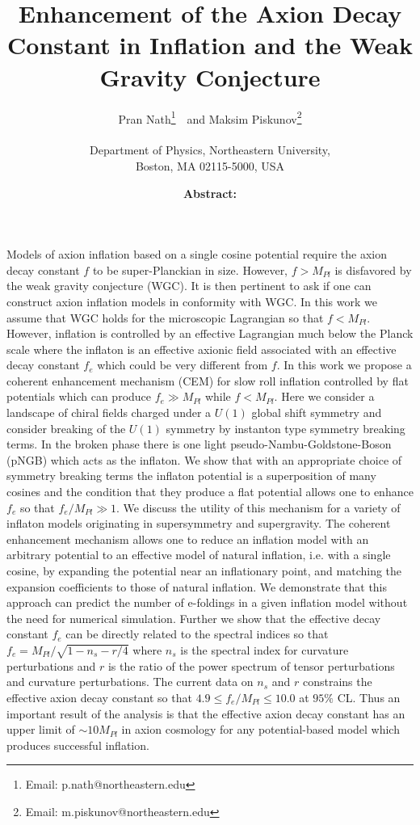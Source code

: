 \documentclass[12pt]{article}
\author{
  Pran Nath\footnote{Email: p.nath@northeastern.edu}~\ and
  Maksim Piskunov\footnote{Email: m.piskunov@northeastern.edu}\\~\\
  Department of Physics, Northeastern University,\\
  Boston, MA 02115-5000, USA
}
\title{
  Enhancement of the Axion Decay Constant in Inflation and the Weak Gravity Conjecture
}
\begin{document}
\maketitle
\date

\textbf{Abstract:}
Models of axion inflation based on a single cosine potential require the axion decay constant $f$ to be super-Planckian in size.
However, $f > M_{Pl}$ is disfavored by the weak gravity conjecture (WGC).
It is then pertinent to ask if one can construct axion inflation models in conformity with WGC.
In this work we assume that WGC holds for the microscopic Lagrangian so that $f < M_{Pl}$.
However, inflation is controlled by an effective Lagrangian much below the Planck scale where the inflaton is an effective axionic field associated with an effective decay constant $f_e$ which could be very different from $f$.
In this work we propose a coherent enhancement mechanism (CEM) for slow roll inflation controlled by flat potentials which can produce $f_e \gg M_{Pl}$ while $f < M_{Pl}$.
Here we consider a landscape of chiral fields charged under a $U\left(1\right)$ global shift symmetry and consider breaking of the $U\left(1\right)$ symmetry by instanton type symmetry breaking terms.
In the broken phase there is one light pseudo-Nambu-Goldstone-Boson (pNGB) which acts as the inflaton.
We show that with an appropriate choice of symmetry breaking terms the inflaton potential is a superposition of many cosines and the condition that they produce a flat potential allows one to enhance $f_e$ so that $f_e / M_{Pl} \gg 1$.
We discuss the utility of this mechanism for a variety of inflaton models originating in supersymmetry and supergravity.
The coherent enhancement mechanism allows one to reduce an inflation model with an arbitrary potential to an effective model of natural inflation, i.e. with a single cosine, by expanding the potential near an inflationary point, and matching the expansion coefficients to those of natural inflation.
We demonstrate that this approach can predict the number of e-foldings in a given inflation model without the need for numerical simulation.
Further we show that the effective decay constant $f_e$ can be directly related to the spectral indices so that $f_e = M_{Pl} / \sqrt{1 - n_s - r / 4}$ where $n_s$ is the spectral index for curvature perturbations and $r$ is the ratio of the power spectrum of tensor perturbations and curvature perturbations.
The current data on $n_s$ and $r$ constrains the effective axion decay constant so that $4.9 \leq f_e / M_{Pl} \leq 10.0$ at $95\%$ CL.
Thus an important result of the analysis is that the effective axion decay constant has an upper limit of $\sim 10 M_{Pl}$ in axion cosmology for any potential-based model which produces successful inflation.
\end{document}

